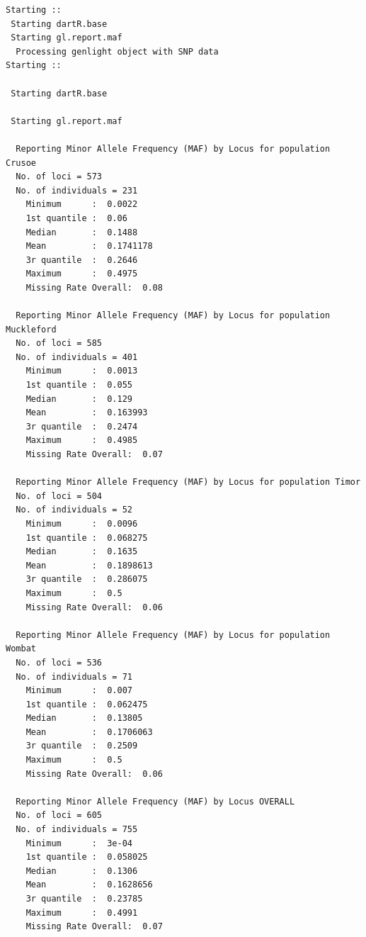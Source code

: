 \documentclass[
  letterpaper,
  DIV=11,
  numbers=noendperiod]{scrreprt}
\let\textttOrig\texttt
\renewcommand{\texttt}[1]{\textttOrig{\color{blue}{#1}}}
\begin{document}
\begin{verbatim}
Starting :: 
 Starting dartR.base 
 Starting gl.report.maf 
  Processing genlight object with SNP data
Starting :: 

 Starting dartR.base 

 Starting gl.report.maf 

  Reporting Minor Allele Frequency (MAF) by Locus for population Crusoe 
  No. of loci = 573 
  No. of individuals = 231 
    Minimum      :  0.0022 
    1st quantile :  0.06 
    Median       :  0.1488 
    Mean         :  0.1741178 
    3r quantile  :  0.2646 
    Maximum      :  0.4975 
    Missing Rate Overall:  0.08 

  Reporting Minor Allele Frequency (MAF) by Locus for population Muckleford 
  No. of loci = 585 
  No. of individuals = 401 
    Minimum      :  0.0013 
    1st quantile :  0.055 
    Median       :  0.129 
    Mean         :  0.163993 
    3r quantile  :  0.2474 
    Maximum      :  0.4985 
    Missing Rate Overall:  0.07 

  Reporting Minor Allele Frequency (MAF) by Locus for population Timor 
  No. of loci = 504 
  No. of individuals = 52 
    Minimum      :  0.0096 
    1st quantile :  0.068275 
    Median       :  0.1635 
    Mean         :  0.1898613 
    3r quantile  :  0.286075 
    Maximum      :  0.5 
    Missing Rate Overall:  0.06 

  Reporting Minor Allele Frequency (MAF) by Locus for population Wombat 
  No. of loci = 536 
  No. of individuals = 71 
    Minimum      :  0.007 
    1st quantile :  0.062475 
    Median       :  0.13805 
    Mean         :  0.1706063 
    3r quantile  :  0.2509 
    Maximum      :  0.5 
    Missing Rate Overall:  0.06 

  Reporting Minor Allele Frequency (MAF) by Locus OVERALL
  No. of loci = 605 
  No. of individuals = 755 
    Minimum      :  3e-04 
    1st quantile :  0.058025 
    Median       :  0.1306 
    Mean         :  0.1628656 
    3r quantile  :  0.23785 
    Maximum      :  0.4991 
    Missing Rate Overall:  0.07 
\end{verbatim}

\begin{figure}[H]

{\centering \texttt{[image: Session10\_SexLinkedMarkers\_files/figure-pdf/unnamed-chunk-14-9.pdf]}

}

\end{figure}
\end{document}
